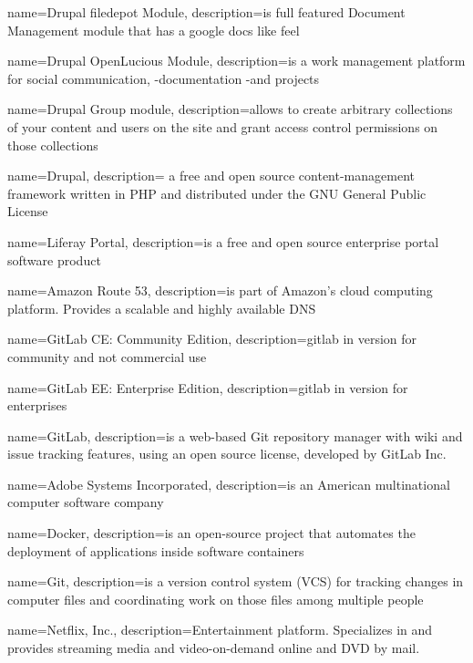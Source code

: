 

{
	name={Drupal filedepot Module},
	description={is full featured Document Management module that has a google docs like feel \cite{bib:drupal-module-filedepot}}
}

{
	name={Drupal OpenLucious Module},
	description={is a work management platform for social communication, -documentation -and projects \cite{bib:drupal-module-openlucious}}
}


{
	name={Drupal Group module},
	description={allows to create arbitrary collections of your content and users on the site and grant access control permissions on those collections \cite{bib:drupal-module-group}}
}

{
	name={Drupal},
	description={ a free and open source content-management framework written in PHP and distributed under the GNU General Public License}
}

{
	name={Liferay Portal},
	description={is a free and open source enterprise portal software product}
}

{
	name={Amazon Route 53},
	description={is part of Amazon's cloud computing platform. Provides a scalable and highly available \gls{DNS}}
}

{
	name={GitLab CE: Community Edition},
	description={\gls{gitlab} in version for community and not commercial use}
}

{
	name={GitLab EE: Enterprise Edition},
	description={\gls{gitlab} in version for enterprises}
}

{
	name={GitLab},
	description={is a web-based Git repository manager with wiki and issue tracking features, using an open source license, developed by GitLab Inc. \cite{bib:gitlab-wiki}}
}

{
	name={Adobe Systems Incorporated},
	description={is an American multinational computer software company \cite{bib:adobe}}
}

{
	name={Docker},
	description={is an open-source project that automates the deployment of applications inside software containers \cite{bib:docker}}
}

{
	name={Git},
	description={is a version control system (VCS) for tracking changes in computer files and coordinating work on those files among multiple people}
}

{
	name={Netflix, Inc.},
	description={Entertainment platform. Specializes in and provides streaming media and video-on-demand online and DVD by mail. \cite{bib:netflix}}
}